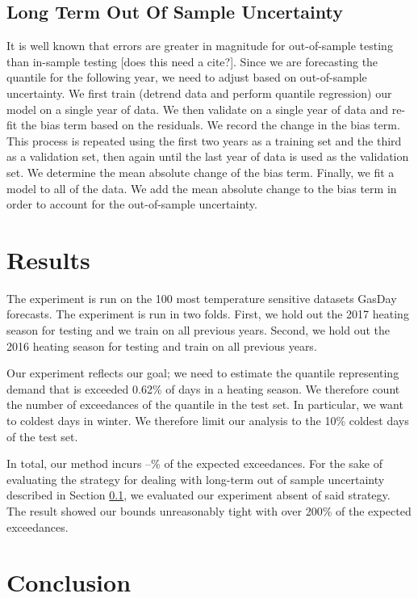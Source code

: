\documentclass{article}
\begin{document}
\subsection{Long Term Out Of Sample Uncertainty} \label{longterm}

It is well known that errors are greater in magnitude for out-of-sample testing than in-sample testing [does this need a cite?]. Since we are forecasting the quantile for the following year, we need to adjust based on out-of-sample uncertainty. We first train (detrend data and perform quantile regression) our model on a single year of data. We then validate on a single year of data and re-fit the bias term based on the residuals. We record the change in the bias term. This process is repeated using the first two years as a training set and the third as a validation set, then again until the last year of data is used as the validation set. We determine the mean absolute change of the bias term. Finally, we fit a model to all of the data. We add the mean absolute change to the bias term in order to account for the out-of-sample uncertainty.

\section{Results}

The experiment is run on the 100 most temperature sensitive datasets GasDay forecasts. The experiment is run in two folds. First, we hold out the 2017 heating season for testing and we train on all previous years. Second, we hold out the 2016 heating season for testing and train on all previous years.

Our experiment reflects our goal; we need to estimate the quantile representing demand that is exceeded 0.62\% of days in a heating season. We therefore count the number of exceedances of the quantile in the test set. In particular, we want to coldest days in winter. We therefore limit our analysis to the 10\% coldest days of the test set.


 In total, our method incurs --\% of the expected exceedances. For the sake of evaluating the strategy for dealing with long-term out of sample uncertainty described in Section \ref{longterm}, we evaluated our experiment absent of said strategy. The result showed our bounds unreasonably tight with over 200\% of the expected exceedances.

\section{Conclusion}






\end{document}
